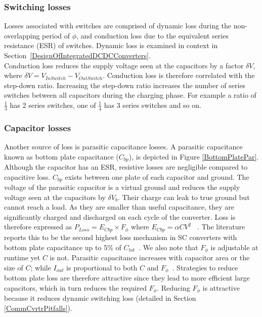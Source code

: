 \documentclass[letterpaper,twocolumn,10pt]{article}
\begin{document}
\subsubsection{Switching losses }
Losses associated with switches are comprised of dynamic loss during the non-overlapping period of $\phi$, and conduction loss due to the equivalent series resistance (ESR) of switches. Dynamic loss is examined in context in Section~\ref{DesignOfIntegratedDCDCConverters}.\\
Conduction loss reduces the supply voltage seen at the capacitors by a factor $\delta V$, where $\delta V = V_{In Switch} - V_{Out Switch}$. Conduction loss is therefore correlated with the step-down ratio. Increasing the step-down ratio increases the number of series switches between all capacitors during the charging phase. For example a ratio of $\frac{1}{3}$ has 2 series switches, one of $\frac{1}{4}$ has 3 series switches and so on.\\
\subsubsection{Capacitor losses }
Another source of loss is parasitic capacitance losses. A parasitic capacitance known as bottom plate capacitance ($C_{bp}$), is depicted in Figure \ref{BottomPlatePar}. Although the capacitor has an ESR, resistive losses are negligible compared to capacitive loss. $C_{bp}$ exists between one plate of each capacitor and ground. The voltage of the parasitic capacitor is a virtual ground and reduces the supply voltage seen at the capacitors by $\delta V_b$. Their charge can leak to true ground but cannot reach a load. As they are smaller than useful capacitance, they are significantly charged and discharged on each cycle of the converter. Loss is therefore expressed as $P_{Loss} = E_{Cbp} \times F_\phi$ where $E_{Cbp} = \alpha CV^2$ ~\cite{Damak2013}. The literature reports this to be the second highest loss mechanism in SC converters with bottom plate capacitance up to 5\% of $C_{tot}$~\cite{Ramadass2007}. We also note that $F_\phi$ is adjustable at runtime yet $C$ is not. Parasitic capacitance increases with capacitor area or the size of $C$; while $I_{out}$ is proportional to both $C$ and $F_\phi$~\cite{Damak2013}. Strategies to reduce bottom plate loss are therefore attractive since they lead to more efficient large capacitors, which in turn reduces the required $F_\phi$. Reducing $F_\phi$ is attractive because it reduces dynamic switching loss (detailed in Section \ref{CommCvrtrPitfalls}). 
\end{document}

